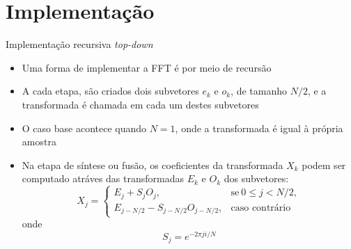 \section{Implementação}

\begin{frame}[fragile]{Implementação recursiva {\it top-down}}

    \begin{itemize}
        \item Uma forma de implementar a FFT é por meio de recursão

        \item A cada etapa, são criados dois subvetores $e_k$ e $o_k$, de tamanho $N/2$, e a 
            transformada é chamada em cada um destes subvetores

        \item O caso base acontece quando $N = 1$, onde a transformada é igual à própria amostra

        \item Na etapa de síntese ou fusão, os coeficientes da transformada $X_k$ podem ser
            computado atráves das transformadas $E_k$ e $O_k$ dos subvetores:
        \[
            X_j = \left\{ \begin{array}{ll}
                E_j + S_jO_j,& \mbox{se}\ 0 \leq j < N/2,\\
                E_{j - N/2} - S_{j - N/2}O_{j - N/2},& \mbox{caso contrário}
            \end{array}\right.
        \]
        onde
        \[
            S_j = e^{-2\pi ji/N}
        \]
    \end{itemize}

\end{frame}

